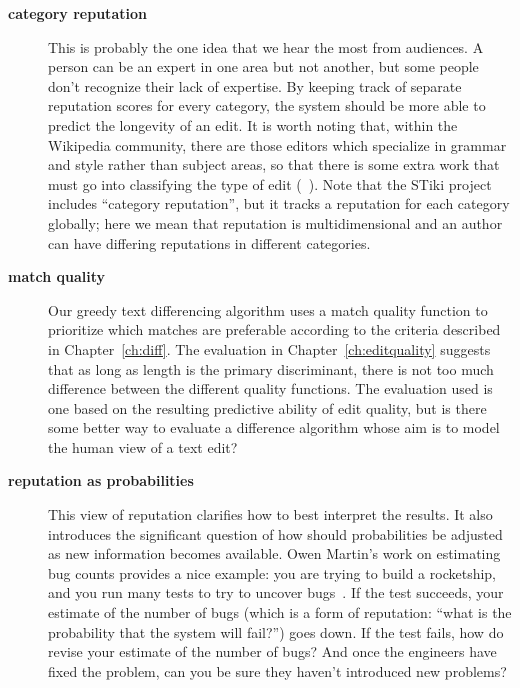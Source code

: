 \begin{description}
\item[\textbf{category reputation}]
    This is probably the one idea that we hear the most from audiences.
    A person can be
    an expert in one area but not another, but some people don't
    recognize their lack of expertise.
    By keeping track of separate reputation scores for every category,
    the system should be more able to predict the longevity of an edit.
    It is worth noting that, within the Wikipedia community, there
    are those editors which specialize in grammar and style rather than
    subject areas, so that there is some extra work that must go
    into classifying the type of edit (\eg~\cite{Fong2010}).
    Note that the STiki project~\cite{West2010} includes ``category
    reputation'', but it tracks a reputation for each category globally;
    here we mean that reputation is multidimensional and an author can
    have differing reputations in different categories.

\item[\textbf{match quality}] Our greedy text differencing algorithm
    uses a match quality function to prioritize which matches are
    preferable according to the criteria described in Chapter~\ref{ch:diff}.
    The evaluation in Chapter~\ref{ch:editquality}
    suggests that as long as length
    is the primary discriminant, there is not too much difference
    between the different quality functions.
    The evaluation used is one based on the resulting predictive ability
    of edit quality, but is there some better way to evaluate a difference
    algorithm whose aim is to model the human view of a text edit?

\item[\textbf{reputation as probabilities}]  This view of reputation
    clarifies how to best interpret the results.
    It also introduces the significant question of how should probabilities
    be adjusted as new information becomes available.
    Owen Martin's work on estimating bug counts provides a nice example:
    you are trying to build a rocketship, and you run many
    tests to try to uncover bugs~\cite{Martin2011}.
    If the test succeeds, your estimate
    of the number of bugs (which is a form of reputation: ``what is
    the probability that the system will fail?'') goes down.
    If the test fails, how do revise your estimate of the number
    of bugs?  And once the engineers have fixed the problem, can
    you be sure they haven't introduced new problems?


\end{description}
